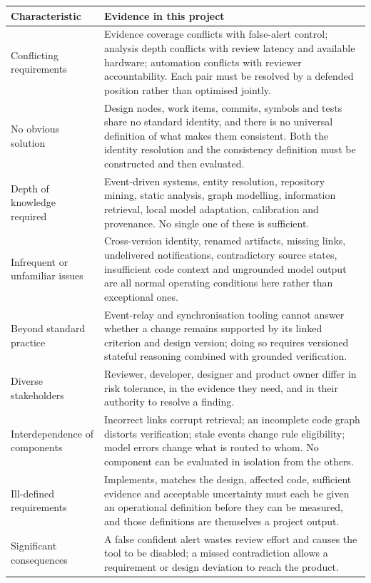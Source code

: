 \begin{longtable}{>{\raggedright\arraybackslash}p{}>{\raggedright\arraybackslash}p{}}
\toprule
Characteristic & Evidence in this project \\
\midrule
\endhead
Conflicting requirements
  & Evidence coverage conflicts with false-alert control; analysis depth
    conflicts with review latency and available hardware; automation conflicts
    with reviewer accountability. Each pair must be resolved by a defended
    position rather than optimised jointly. \\
No obvious solution
  & Design nodes, work items, commits, symbols and tests share no standard
    identity, and there is no universal definition of what makes them
    consistent. Both the identity resolution and the consistency definition must
    be constructed and then evaluated. \\
Depth of knowledge required
  & Event-driven systems, entity resolution, repository mining, static analysis,
    graph modelling, information retrieval, local model adaptation, calibration
    and provenance. No single one of these is sufficient. \\
Infrequent or unfamiliar issues
  & Cross-version identity, renamed artifacts, missing links, undelivered
    notifications, contradictory source states, insufficient code context and
    ungrounded model output are all normal operating conditions here rather
    than exceptional ones. \\
Beyond standard practice
  & Event-relay and synchronisation tooling cannot answer whether a change
    remains supported by its linked criterion and design version; doing so
    requires versioned stateful reasoning combined with grounded verification. \\
Diverse stakeholders
  & Reviewer, developer, designer and product owner differ in risk tolerance,
    in the evidence they need, and in their authority to resolve a finding. \\
Interdependence of components
  & Incorrect links corrupt retrieval; an incomplete code graph distorts
    verification; stale events change rule eligibility; model errors change what
    is routed to whom. No component can be evaluated in isolation from the
    others. \\
Ill-defined requirements
  & Implements, matches the design, affected code, sufficient evidence and
    acceptable uncertainty must each be given an operational definition before
    they can be measured, and those definitions are themselves a project
    output. \\
Significant consequences
  & A false confident alert wastes review effort and causes the tool to be
    disabled; a missed contradiction allows a requirement or design deviation to
    reach the product. \\
\bottomrule
\end{longtable}

